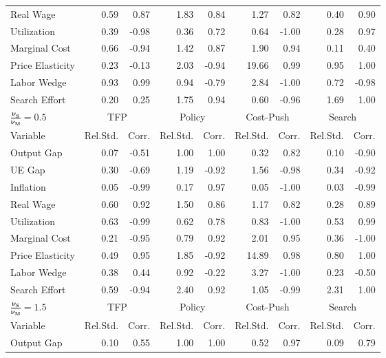 \documentclass[12pt,3p,authoryear,review]{elsarticle}
\begin{document}
\begin{table}[h!]
\begin{center}
\begin{footnotesize}
\begin{tabular}{l r r r r r r r r}
				Real Wage & 0.59 & 0.87 & 1.83 & 0.84 & 1.27 & 0.82 & 0.40 & 0.90\\%
				Utilization & 0.39 & -0.98 & 0.36 & 0.72 & 0.64 & -1.00 & 0.28 & 0.97\\%
				Marginal Cost & 0.66 & -0.94 & 1.42 & 0.87 & 1.90 & 0.94 & 0.11 & 0.40\\%
				Price Elasticity & 0.23 & -0.13 & 2.03 & -0.94 & 19.66 & 0.99 & 0.95 & 1.00\\%
				Labor Wedge & 0.93 & 0.99 & 0.94 & -0.79 & 2.84 & -1.00 & 0.72 & -0.98\\%
				Search Effort & 0.20 & 0.25 & 1.75 & 0.94 & 0.60 & -0.96 & 1.69 & 1.00\\%
				\hline%
				\hline%
				$\boldsymbol{\frac{\nu_S}{\nu_M} = 0.5}$ & \multicolumn{2}{c}{TFP} & \multicolumn{2}{c}{Policy} & \multicolumn{2}{c}{Cost-Push} & \multicolumn{2}{c}{Search}\\%
				Variable & Rel.Std. & Corr. & Rel.Std. & Corr. & Rel.Std. & Corr. & Rel.Std. & Corr.\\%
				\hline \hline%
				Output Gap & 0.07 & -0.51 & 1.00 & 1.00 & 0.32 & 0.82 & 0.10 & -0.90\\%
				UE Gap & 0.30 & -0.69 & 1.19 & -0.92 & 1.56 & -0.98 & 0.34 & -0.92\\%
				Inflation & 0.05 & -0.99 & 0.17 & 0.97 & 0.05 & -1.00 & 0.03 & -0.99\\%
				Real Wage & 0.60 & 0.92 & 1.50 & 0.86 & 1.17 & 0.82 & 0.28 & 0.89\\%
				Utilization & 0.63 & -0.99 & 0.62 & 0.78 & 0.83 & -1.00 & 0.53 & 0.99\\%
				Marginal Cost & 0.21 & -0.95 & 0.79 & 0.92 & 2.01 & 0.95 & 0.36 & -1.00\\%
				Price Elasticity & 0.49 & 0.95 & 1.85 & -0.92 & 14.89 & 0.98 & 0.80 & 1.00\\%
				Labor Wedge & 0.38 & 0.44 & 0.92 & -0.22 & 3.27 & -1.00 & 0.23 & -0.50\\%
				Search Effort & 0.59 & -0.94 & 2.40 & 0.92 & 1.05 & -0.99 & 2.31 & 1.00\\%
				\hline%
				\hline%
				$\boldsymbol{\frac{\nu_S}{\nu_M} = 1.5}$ & \multicolumn{2}{c}{TFP} & \multicolumn{2}{c}{Policy} & \multicolumn{2}{c}{Cost-Push} & \multicolumn{2}{c}{Search}\\%
				Variable & Rel.Std. & Corr. & Rel.Std. & Corr. & Rel.Std. & Corr. & Rel.Std. & Corr.\\%
				\hline \hline%
				Output Gap & 0.10 & 0.55 & 1.00 & 1.00 & 0.52 & 0.97 & 0.09 & 0.79\\%

\end{tabular}
\end{footnotesize}
\end{center}
\end{table}
\end{document}
